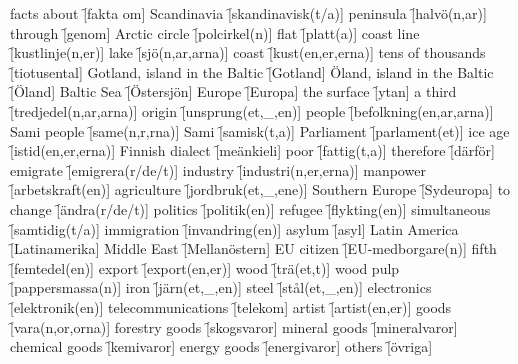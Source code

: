 \begin{questions}
    \begin{multicols}{2}
        \raggedcolumns
        \question facts about \f[fakta om]
        \question Scandinavia \f[skandinavisk(t/a)]
        \question peninsula \f[halvö(n,ar)]
        \question through \f[genom]
        \question Arctic circle \f[polcirkel(n)]
        \question flat \f[platt(a)]
        \question coast line \f[kustlinje(n,er)]
        \question lake \f[sjö(n,ar,arna)]
        \question coast \f[kust(en,er,erna)]
        \question tens of thousands \f[tiotusental]
        \question Gotland, island in the Baltic \f[Gotland]
        \question Öland, island in the Baltic \f[Öland]
        \question Baltic Sea \f[Östersjön]
        \question Europe \f[Europa]
        \question the surface \f[ytan]
        \question a third \f[tredjedel(n,ar,arna)]
        \question origin \f[unsprung(et,\_,en)]
        \question people \f[befolkning(en,ar,arna)]
        \question Sami people \f[same(n,r,rna)]
        \question Sami \f[samisk(t,a)]
        \question Parliament \f[parlament(et)]
        \question ice age \f[istid(en,er,erna)]
        \question Finnish dialect \f[meänkieli]
        \question poor \f[fattig(t,a)]
        \question therefore \f[därför]
        \question emigrate \f[emigrera(r/de/t)]
        \question industry \f[industri(n,er,erna)]
        \question manpower \f[arbetskraft(en)]
        \question agriculture \f[jordbruk(et,\_,ene)]
        \question Southern Europe \f[Sydeuropa]
        \question to change \f[ändra(r/de/t)]
        \question politics \f[politik(en)]
        \question refugee \f[flykting(en)]
        \question simultaneous \f[samtidig(t/a)]
        \question immigration \f[invandring(en)]
        \question asylum \f[asyl]
        \question Latin America \f[Latinamerika]
        \question Middle East \f[Mellanöstern]
        \question EU citizen \f[EU-medborgare(n)]
        \question fifth \f[femtedel(en)]
        \question export \f[export(en,er)]
        \question wood \f[trä(et,t)]
        \question wood pulp \f[pappersmassa(n)]
        \question iron \f[järn(et,\_,en)]
        \question steel \f[stål(et,\_,en)]
        \question electronics \f[elektronik(en)]
        \question telecommunications \f[telekom]
        \question artist \f[artist(en,er)]
        \question goods \f[vara(n,or,orna)]
        \question forestry goods \f[skogsvaror]
        \question mineral goods \f[mineralvaror]
        \question chemical goods \f[kemivaror]
        \question energy goods \f[energivaror]
        \question others \f[övriga]

\end{multicols}
\end{questions}
